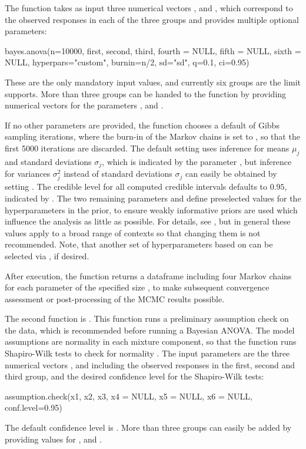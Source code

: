 The  function takes as input three numerical vectors ,  and , which correspond to the observed responses in each of the three groups and provides multiple optional parameters:
\begin{example}
bayes.anova(n=10000, first, second, third, 
fourth = NULL, fifth = NULL, sixth = NULL, 
hyperpars="custom", burnin=n/2, sd="sd", q=0.1, ci=0.95)
\end{example}
These are the only mandatory input values, and currently six groups are the limit  supports. More than three groups can be handed to the function by providing numerical vectors for the parameters ,  and .

If no other parameters are provided, the function chooses a default of  Gibbs sampling iterations, where the burn-in of the Markov chains is set to , so that the first 5000 iterations are discarded. The default setting uses inference for means $\mu_j$ and standard deviations $\sigma_j$, which is indicated by the parameter , but inference for variances $\sigma_j^2$ instead of standard deviations $\sigma_j$ can easily be obtained by setting . The credible level for all computed credible intervals defaults to $0.95$, indicated by . The two remaining parameters  and  define preselected values for the hyperparameters in the prior, to ensure weakly informative priors are used which influence the analysis as little as possible. For details, see \cite{Kelter2020JORSBayest,Kelter2021StatisticsInBiosciences}, but in general these values apply to a broad range of contexts so that changing them is not recommended. Note, that another set of hyperparameters based on \cite{Raftery1996} can be selected via , if desired.

After execution, the function returns a dataframe including four Markov chains for each parameter of the specified size , to make subsequent convergence assessment or post-processing of the MCMC results possible.

The second function is . This function runs a preliminary assumption check on the data, which is recommended before running a Bayesian ANOVA. The model assumptions are normality in each mixture component, so that the  function runs Shapiro-Wilk tests to check for normality \citep{shapiro_analysis_1965}. The input parameters are the three numerical vectors ,  and  including the observed responses in the first, second and third group, and the desired confidence level  for the Shapiro-Wilk tests:
\begin{example}
assumption.check(x1, x2, x3, x4 = NULL, x5 = NULL, x6 = NULL, conf.level=0.95)
\end{example}
The default confidence level is . More than three groups can easily be added by providing values for ,  and .

